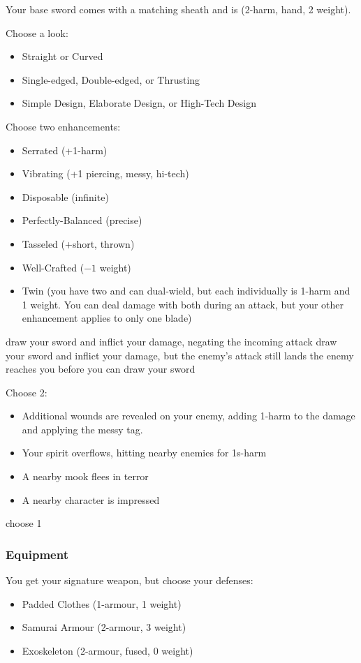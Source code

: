 Your base sword comes with a matching sheath and is (2-harm, hand, 2 weight).

Choose a look:
\begin{itemize}
\item Straight or Curved
\item Single-edged, Double-edged, or Thrusting
\item Simple Design, Elaborate Design, or High-Tech Design
\end{itemize}

Choose two enhancements:
\begin{itemize}
\item Serrated (+1-harm)
\item Vibrating (+1 piercing, messy, hi-tech)
\item Disposable (infinite)
\item Perfectly-Balanced (precise)
\item Tasseled (+short, thrown)
\item Well-Crafted ($-1$ weight)
\item Twin (you have two and can dual-wield, but each individually is 1-harm and 1 weight. You can deal damage with both during an attack, but your other enhancement applies to only one blade)
\end{itemize}

{draw your sword and inflict your damage, negating the incoming attack}
{draw your sword and inflict your damage, but the enemy's attack still lands}
{the enemy reaches you before you can draw your sword}

{Choose 2:
\begin{itemize}
\item Additional wounds are revealed on your enemy, adding 1-harm to the damage and applying the messy tag.
\item Your spirit overflows, hitting nearby enemies for 1s-harm
\item A nearby mook flees in terror
\item A nearby character is impressed
\end{itemize}}
{choose 1}

\subsubsection{Equipment}
You get your signature weapon, but choose your defenses:
\begin{itemize}
\item Padded Clothes (1-armour, 1 weight)
\item Samurai Armour (2-armour, 3 weight)
\item Exoskeleton (2-armour, fused, 0 weight)
\end{itemize}

